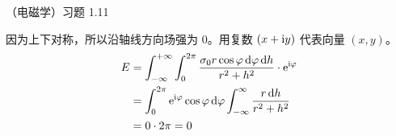 \begin{problem}
	（电磁学）习题 1.11
	\begin{solution}
		因为上下对称，所以沿轴线方向场强为 $0$。用复数 $(x + \mathrm{i} y)$ 代表向量 $(x, y)$。
		$$
		\begin{aligned}
			E & = \int_{-\infty}^{+\infty} \int_{0}^{2\pi} \frac{\sigma_0 r \cos \varphi \dd{\varphi} \dd{h}}{r^2 + h^2} \cdot \mathrm{e}^{\mathrm{i} \varphi} \\
			& = \int_{0}^{2\pi} \mathrm{e}^{\mathrm{i} \varphi} \cos \varphi \dd{\varphi} \int_{-\infty}^{\infty} \frac{r \dd{h}}{r^2 + h^2} \\
			& = 0 \cdot 2\pi = 0
		\end{aligned}
		$$
	\end{solution}
\end{problem}
